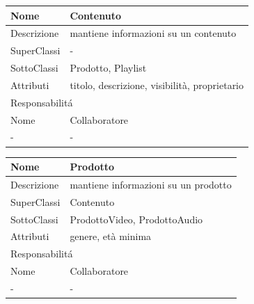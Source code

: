 


\begin{center} %
    \begin{longtable}{ |p{3cm}|p{3cm}|p{3cm}|p{3cm}| }
        \hline
        Nome & \multicolumn{3}{|p{9cm}|}{Contenuto} \\\hline
        Descrizione & \multicolumn{3}{|p{9cm}|}{mantiene informazioni su un contenuto} \\\hline
        SuperClassi & \multicolumn{3}{|p{9cm}|}{-} \\\hline
        SottoClassi & \multicolumn{3}{|p{9cm}|}{Prodotto, Playlist} \\\hline
        Attributi & \multicolumn{3}{|p{9cm}|}{titolo, descrizione, visibilità, proprietario} \\\hline
        \multicolumn{4}{|p{12cm}|}{Responsabilit\'a} \\\hline %
        \multicolumn{2}{|p{6cm}|}{Nome} & \multicolumn{2}{|p{6cm}|}{Collaboratore} \\\hline
        \multicolumn{2}{|p{6cm}|}{-} & \multicolumn{2}{|p{6cm}|}{-} \\\hline
    \end{longtable}
\end{center}


\begin{center} %
    \begin{longtable}{ |p{3cm}|p{3cm}|p{3cm}|p{3cm}| }
        \hline
        Nome & \multicolumn{3}{|p{9cm}|}{Prodotto} \\\hline
        Descrizione & \multicolumn{3}{|p{9cm}|}{mantiene informazioni su un prodotto} \\\hline
        SuperClassi & \multicolumn{3}{|p{9cm}|}{Contenuto} \\\hline
        SottoClassi & \multicolumn{3}{|p{9cm}|}{ProdottoVideo, ProdottoAudio} \\\hline
        Attributi & \multicolumn{3}{|p{9cm}|}{genere, età minima} \\\hline
        \multicolumn{4}{|p{12cm}|}{Responsabilit\'a} \\\hline %
        \multicolumn{2}{|p{6cm}|}{Nome} & \multicolumn{2}{|p{6cm}|}{Collaboratore} \\\hline
        \multicolumn{2}{|p{6cm}|}{-} & \multicolumn{2}{|p{6cm}|}{-} \\\hline
    \end{longtable}
\end{center}


